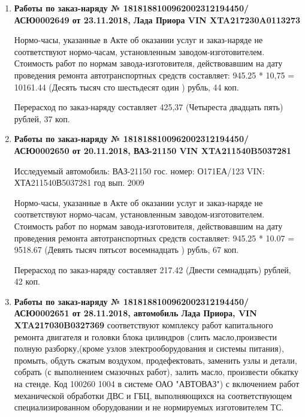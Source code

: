 \begin{enumerate}

\item \par\textbf{{Работы по заказ-наряду  № 1818188100962002312194450/\-АСЮ0002649 от 23.11.2018, Лада Приора  VIN  XTA217230A0113273
}}



Нормо-часы, указанные в Акте об оказании услуг и заказ-наряде не соответствуют нормо-часам,  установленным заводом-изготовителем.\\
Стоимость работ по нормам завода-изготовителя, действовавшим на дату проведения ремонта автотранспортных средств составляет: 945.25 * 10,75  = 10161.44 (Десять тысяч сто шестьдесят один ) рубль, 44 коп.

Перерасход по заказ-наряду составляет 425,37 (Четыреста двадцать пять) рублей, 37 коп.  
\vspace{3mm}


\item \par\textbf{{Работы по заказ-наряду   № 1818188100962002312194450/\-АСЮ0002650 от 20.11.2018, ВАЗ-21150 VIN  XTA211540B5037281
}}

Исследуемый автомобиль:  ВАЗ-21150 гос. номер: О171ЕА/123 VIN: ХТА211540В5037281 год вып. 2009




Нормо-часы, указанные в Акте об оказании услуг и заказ-наряде не соответствуют нормо-часам,  установленным заводом-изготовителем.\\
Стоимость работ по нормам завода-изготовителя, действовавшим на дату проведения ремонта автотранспортных средств составляет: 945.25 * 10.07  = 9518.67 (Девять тысяч пятьсот восемнадцать ) рубль, 67 коп.

Перерасход по заказ-наряду составляет 217.42 (Двести семнадцать) рублей, 42 коп.  
\vspace{3mm}





	\item \par\textbf{{Работы по заказ-наряду № 1818188100962002312194450/\-АСЮ0002651 от 28.11.2018, автомобиль Лада Приора, VIN XTA217030B0327369}} соответствуют комплексу работ капитального ремонта двигателя и головки блока цилиндров  (слить масло,произвести полную разборку,(кроме узлов электрооборудования и системы питания), промыть, обдуть сжатым воздухом, продефектовать, заменить узлы и детали, собрать (с выполнением смазочных работ), залить масло, произвести обкатку на стенде. Код 100260 1004 в системе ОАО "АВТОВАЗ") с включением работ механической обработки ДВС и ГБЦ, выполняющихся на соответствующем специализированном оборудовании и   не нормируемых изготовителем ТС.\\



\end{enumerate}
